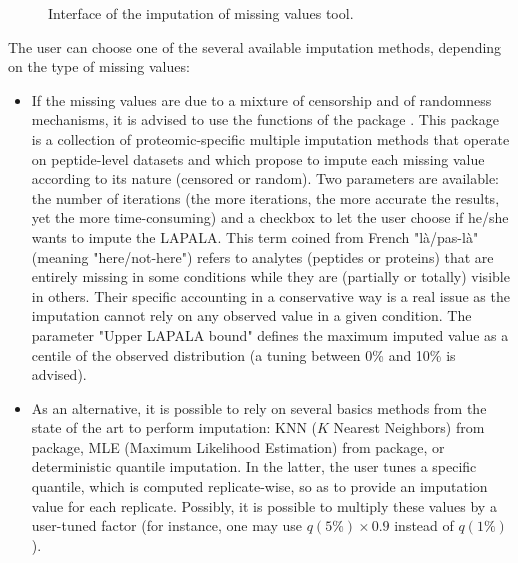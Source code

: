 \documentclass[12pt]{article}
\begin{document}
{\begin {figure}
\centering
{}
\caption{Interface of the imputation of missing values tool.}\label{fig:impu}
\end {figure}

The user can choose one of the several available imputation methods, depending 
on the type of missing values:
\begin{itemize}
\item If the missing values are due to a mixture of censorship and of randomness
mechanisms, it is advised to use the functions of the package . This 
package is a collection of proteomic-specific 
multiple imputation methods that operate on peptide-level datasets and which 
propose to impute each missing value according to its nature (censored or 
random). Two parameters are available: the number of iterations (the more 
iterations, the more accurate the results, yet the more time-consuming) and a 
checkbox to let the user choose if he/she wants to impute the LAPALA. This
term coined from French "l\`a/pas-l\`a"(meaning "here/not-here") refers to analytes 
(peptides or proteins) that are entirely missing in some conditions while they
are (partially or totally) visible in others. Their specific accounting in a 
conservative way is a real issue as the imputation cannot rely on any observed 
value in a given condition. The parameter "Upper LAPALA bound" defines the 
maximum imputed value as a centile of the observed distribution (a tuning 
between 0\% and 10\% is advised).


\item As an alternative, it is possible to rely on several basics methods from
the state of the art to perform imputation: KNN ($K$ Nearest Neighbors) 
from  package, 
MLE (Maximum Likelihood Estimation) from  package, 
or deterministic quantile imputation. In the latter, the user tunes a specific 
quantile, which is computed replicate-wise, so as to provide an imputation value
for each replicate. Possibly, it is possible to multiply these values by a user-tuned
factor (for instance, one may use $q(5\%) \times 0.9$ instead of $q(1\%)$).
\end{itemize}

}
\end{document}
